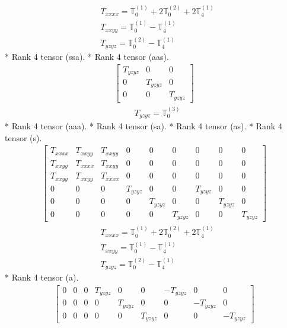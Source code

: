 \documentclass[fleqn,8pt,landscape]{jsarticle}
\begin{document}
\begin{align*}
& T_{xxxx} = \mathbb{T}_{0}^{(1)} + 2 \mathbb{T}_{0}^{(2)} + 2 \mathbb{T}_{4}^{(1)} \\
& T_{xxyy} = \mathbb{T}_{0}^{(1)} - \mathbb{T}_{4}^{(1)} \\
& T_{yzyz} = \mathbb{T}_{0}^{(2)} - \mathbb{T}_{4}^{(1)}
\end{align*}
* Rank 4 tensor (ssa).
* Rank 4 tensor (aas).
\begin{align*}
\begin{bmatrix} T_{yzyz} & 0 & 0 \\ 0 & T_{yzyz} & 0 \\ 0 & 0 & T_{yzyz} \end{bmatrix}
\end{align*}
\begin{align*}
& T_{yzyz} = \mathbb{T}_{0}^{(3)}
\end{align*}
* Rank 4 tensor (aaa).
* Rank 4 tensor (sa).
* Rank 4 tensor (as).
* Rank 4 tensor (s).
\begin{align*}
\begin{bmatrix} T_{xxxx} & T_{xxyy} & T_{xxyy} & 0 & 0 & 0 & 0 & 0 & 0 \\ T_{xxyy} & T_{xxxx} & T_{xxyy} & 0 & 0 & 0 & 0 & 0 & 0 \\ T_{xxyy} & T_{xxyy} & T_{xxxx} & 0 & 0 & 0 & 0 & 0 & 0 \\ 0 & 0 & 0 & T_{yzyz} & 0 & 0 & T_{yzyz} & 0 & 0 \\ 0 & 0 & 0 & 0 & T_{yzyz} & 0 & 0 & T_{yzyz} & 0 \\ 0 & 0 & 0 & 0 & 0 & T_{yzyz} & 0 & 0 & T_{yzyz} \end{bmatrix}
\end{align*}
\begin{align*}
& T_{xxxx} = \mathbb{T}_{0}^{(1)} + 2 \mathbb{T}_{0}^{(2)} + 2 \mathbb{T}_{4}^{(1)} \\
& T_{xxyy} = \mathbb{T}_{0}^{(1)} - \mathbb{T}_{4}^{(1)} \\
& T_{yzyz} = \mathbb{T}_{0}^{(2)} - \mathbb{T}_{4}^{(1)}
\end{align*}
* Rank 4 tensor (a).
\begin{align*}
\begin{bmatrix} 0 & 0 & 0 & T_{yzyz} & 0 & 0 & - T_{yzyz} & 0 & 0 \\ 0 & 0 & 0 & 0 & T_{yzyz} & 0 & 0 & - T_{yzyz} & 0 \\ 0 & 0 & 0 & 0 & 0 & T_{yzyz} & 0 & 0 & - T_{yzyz} \end{bmatrix}
\end{align*}
\end{document}
